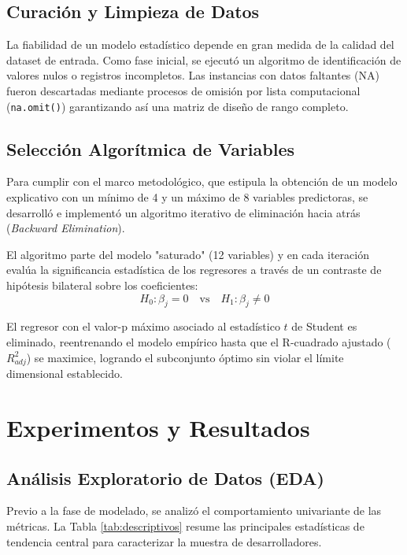 \documentclass[conference]{IEEEtran}
\begin{document}
\subsection{Curación y Limpieza de Datos}
La fiabilidad de un modelo estadístico depende en gran medida de la calidad del dataset de entrada. Como fase inicial, se ejecutó un algoritmo de identificación de valores nulos o registros incompletos. Las instancias con datos faltantes (NA) fueron descartadas mediante procesos de omisión por lista computacional (\texttt{na.omit()}) garantizando así una matriz de diseño de rango completo.

\subsection{Selección Algorítmica de Variables}
Para cumplir con el marco metodológico, que estipula la obtención de un modelo explicativo con un mínimo de 4 y un máximo de 8 variables predictoras, se desarrolló e implementó un algoritmo iterativo de eliminación hacia atrás (\textit{Backward Elimination}). 

El algoritmo parte del modelo "saturado" (12 variables) y en cada iteración evalúa la significancia estadística de los regresores a través de un contraste de hipótesis bilateral sobre los coeficientes:
\begin{equation}
H_0: \beta_j = 0 \quad \text{vs} \quad H_1: \beta_j \neq 0
\end{equation}

El regresor con el valor-p máximo asociado al estadístico $t$ de Student es eliminado, reentrenando el modelo empírico hasta que el R-cuadrado ajustado ($R^2_{adj}$) se maximice, logrando el subconjunto óptimo sin violar el límite dimensional establecido.

\section{Experimentos y Resultados}

\subsection{Análisis Exploratorio de Datos (EDA)}
Previo a la fase de modelado, se analizó el comportamiento univariante de las métricas. La Tabla \ref{tab:descriptivos} resume las principales estadísticas de tendencia central para caracterizar la muestra de desarrolladores.
\end{document}
